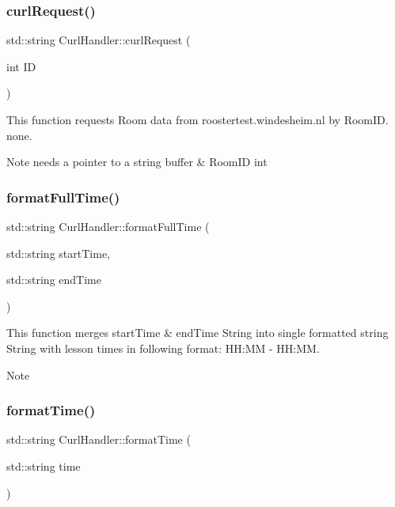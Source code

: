 \subsubsection{\texorpdfstring{curl\+Request()}{curlRequest()}}
{\footnotesize\ttfamily std\+::string Curl\+Handler\+::curl\+Request (\begin{DoxyParamCaption}\item[{int}]{ID }\end{DoxyParamCaption})}



This function requests Room data from roostertest.\+windesheim.\+nl by Room\+ID.  none. 

\begin{DoxyNote}{Note}
needs a pointer to a string buffer \& Room\+ID int 
\end{DoxyNote}
\mbox{\label{classCurlHandler_ae208efd8422979786ee921c5148b17c7}} 
\subsubsection{\texorpdfstring{format\+Full\+Time()}{formatFullTime()}}
{\footnotesize\ttfamily std\+::string Curl\+Handler\+::format\+Full\+Time (\begin{DoxyParamCaption}\item[{std\+::string}]{start\+Time,  }\item[{std\+::string}]{end\+Time }\end{DoxyParamCaption})}



This function merges start\+Time \& end\+Time String into single formatted string  String with lesson times in following format\+: HH\+:MM -\/ HH\+:MM. 

\begin{DoxyNote}{Note}

\end{DoxyNote}
\mbox{\label{classCurlHandler_a8552fd1c4558661d3699e4cbd8897acc}} 
\subsubsection{\texorpdfstring{format\+Time()}{formatTime()}}
{\footnotesize\ttfamily std\+::string Curl\+Handler\+::format\+Time (\begin{DoxyParamCaption}\item[{std\+::string}]{time }\end{DoxyParamCaption})}



